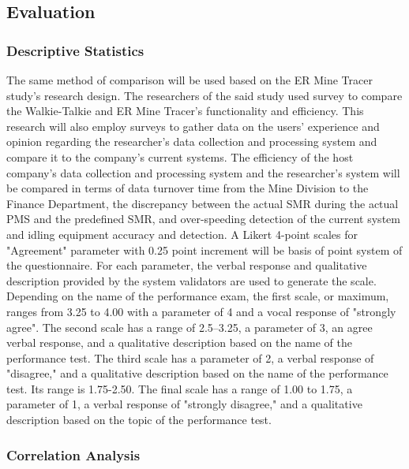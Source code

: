\documentclass[12pt]{report}
\begin{document}
\subsection{Evaluation}

\subsubsection{Descriptive Statistics}

 The same method of comparison will be used based on the ER Mine Tracer study's research design.
 The researchers of the said study used survey to compare the Walkie-Talkie and ER Mine Tracer's functionality and efficiency.
 This research will also employ surveys to gather data on the users' experience and opinion regarding the researcher's data collection and processing system and compare it to the company's current systems.
The efficiency of the host company's data collection and processing system and the researcher's system will be compared in terms of data turnover time from the Mine Division to the Finance Department, the discrepancy between the actual SMR during the actual PMS and the predefined SMR, and over-speeding detection of the current system and idling equipment accuracy and detection.  
A Likert 4-point scales for "Agreement" parameter with 0.25 point increment will be basis of point system of the questionnaire. For each parameter, the verbal response and qualitative description provided by the system validators are used to generate the scale. Depending on the name of the performance exam, the first scale, or maximum, ranges from 3.25 to 4.00 with a parameter of 4 and a vocal response of "strongly agree".
The second scale has a range of 2.5–3.25, a parameter of 3, an agree verbal response, and a qualitative description based on the name of the performance test. The third scale has a parameter of 2, a verbal response of "disagree," and a qualitative description based on the name of the performance test. 
Its range is 1.75-2.50. The final scale has a range of 1.00 to 1.75, a parameter of 1, a verbal response of "strongly disagree," and a qualitative description based on the topic of the performance test.\cite{ERMineTracer} 

\subsubsection{Correlation Analysis}
\end{document}
